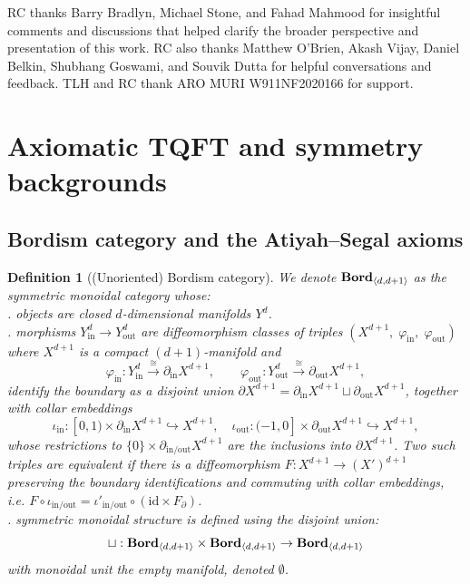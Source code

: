 \documentclass[aps,prx,reprint,superscriptaddress,twocolumn,amsmath,amssymb,amsfonts, nofootinbib]{revtex4-2}
\makeatletter
\newcommand{\bordd}{{\bf Bord}_{\langle d, d+1\rangle}}
\theoremstyle{apsstyle}
\newtheorem{definition}[theorem]{Definition}
\newcommand{\AppendixTOCSectionsOnly}{%
  \renewcommand{\l@subsection}[2]{}%
  \renewcommand{\l@subsubsection}[2]{}%
}
\makeatother
\begin{document}
\begin{acknowledgments}
RC thanks Barry Bradlyn, Michael Stone, and Fahad Mahmood for insightful comments and discussions that helped clarify the broader perspective and presentation of this work. RC also thanks Matthew O'Brien, Akash Vijay, Daniel Belkin, Shubhang Goswami, and Souvik Dutta for helpful conversations and feedback. TLH and RC thank ARO MURI
W911NF2020166 for support. 
\end{acknowledgments}


\addtocontents{toc}{\protect\AppendixTOCSectionsOnly}
\appendix

\section{Axiomatic TQFT and symmetry backgrounds}
\label{app:tqft}

 
\subsection{Bordism category and the Atiyah–Segal axioms}

\begin{definition}[(Unoriented) Bordism category]
\label{def:bordismcategory}
We denote $\bordd$ as the symmetric monoidal category whose:\\
. objects are closed $d$-dimensional manifolds $Y^{d}$.\\
. morphisms $Y^{d}_{\mathrm{in}}\to Y^{d}_{\mathrm{out}}$ are diffeomorphism classes of triples $(X^{d+1},\;\varphi_{\mathrm{in}},\;\varphi_{\mathrm{out}})$ where $X^{d+1}$ is a compact $(d{+}1)$-manifold and
\begin{equation*}
\varphi_{\mathrm{in}}:Y^{d}_{\mathrm{in}}\xrightarrow{\cong}\partial_{\mathrm{in}}X^{d+1},\qquad
\varphi_{\mathrm{out}}:Y^{d}_{\mathrm{out}}\xrightarrow{\cong}\partial_{\mathrm{out}}X^{d+1},
\end{equation*}
identify the boundary as a disjoint union
$\partial X^{d+1}=\partial_{\mathrm{in}}X^{d+1}\sqcup \partial_{\mathrm{out}}X^{d+1}$,
together with collar embeddings
\begin{equation*}
\iota_{\mathrm{in}}:[0,1)\times \partial_{\mathrm{in}}X^{d+1} \hookrightarrow X^{d+1},\quad
\iota_{\mathrm{out}}:(-1,0]\times \partial_{\mathrm{out}}X^{d+1} \hookrightarrow X^{d+1},
\end{equation*}
whose restrictions to $\{0\}\times \partial_{\mathrm{in/out}}X^{d+1}$ are the inclusions into $\partial X^{d+1}$. Two such triples are equivalent if there is a diffeomorphism $F:X^{d+1}\to (X')^{d+1}$ preserving the boundary identifications and commuting with collar embeddings, i.e. $F\circ \iota_{\mathrm{in/out}}=\iota'_{\mathrm{in/out}}\circ (\mathrm{id}\times F_{\partial})$.\\
. symmetric monoidal structure is defined using the disjoint union:
    \begin{equation*}
        \sqcup: \bordd\times \bordd\to \bordd
    \end{equation*}
\noindent with monoidal unit the empty manifold, denoted $\emptyset$.
\end{definition}
\end{document}
